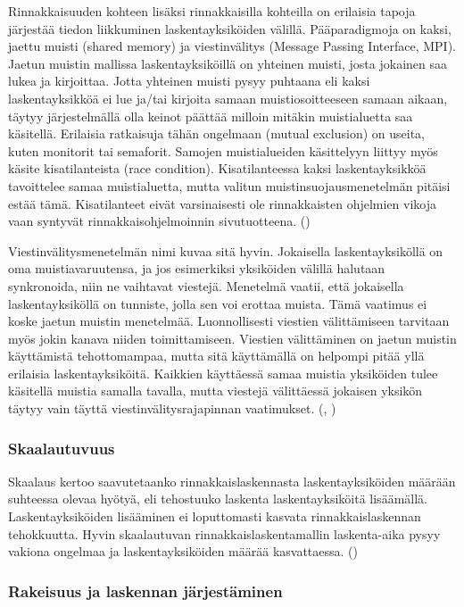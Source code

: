 Rinnakkaisuuden kohteen lisäksi rinnakkaisilla kohteilla on erilaisia tapoja
järjestää tiedon liikkuminen laskentayksiköiden välillä. Pääparadigmoja on
kaksi, jaettu muisti (shared memory) ja viestinvälitys (Message Passing Interface, MPI). Jaetun muistin mallissa
laskentayksiköillä on yhteinen muisti, josta jokainen saa lukea ja kirjoittaa.
Jotta yhteinen muisti pysyy puhtaana eli kaksi laskentayksikköä ei lue ja/tai
kirjoita samaan muistiosoitteeseen samaan aikaan, täytyy järjestelmällä
olla keinot päättää milloin mitäkin muistialuetta saa käsitellä.
Erilaisia ratkaisuja tähän ongelmaan (mutual exclusion) on useita, kuten
monitorit tai semaforit. Samojen muistialueiden käsittelyyn
liittyy myös käsite kisatilanteista (race condition). Kisatilanteessa kaksi
laskentayksikköä tavoittelee samaa muistialuetta, mutta valitun
muistinsuojausmenetelmän pitäisi estää tämä. Kisatilanteet eivät varsinaisesti
ole rinnakkaisten ohjelmien vikoja vaan syntyvät rinnakkaisohjelmoinnin
sivutuotteena. (\citealt{ari})

Viestinvälitysmenetelmän nimi kuvaa sitä hyvin. Jokaisella
laskentayksiköllä on oma muistiavaruutensa, ja jos esimerkiksi  yksiköiden
välillä halutaan synkronoida, niin ne vaihtavat viestejä. Menetelmä vaatii,
että jokaisella laskentayksiköllä on tunniste, jolla sen voi erottaa muista.
Tämä vaatimus ei koske jaetun muistin menetelmää. Luonnollisesti viestien
välittämiseen tarvitaan myös jokin kanava niiden toimittamiseen. Viestien
välittäminen on jaetun muistin käyttämistä tehottomampaa, mutta sitä
käyttämällä on helpompi pitää yllä erilaisia laskentayksiköitä. Kaikkien
käyttäessä samaa muistia yksiköiden tulee käsitellä muistia samalla tavalla,
mutta viestejä välittäessä jokaisen yksikön täytyy vain täyttä
viestinvälitysrajapinnan vaatimukset. (\citealt{intro}, \citealt{rauber})

\subsubsection{Skaalautuvuus}

Skaalaus kertoo saavutetaanko rinnakkaislaskennasta laskentayksiköiden määrään
suhteessa olevaa hyötyä, eli tehostuuko laskenta laskentayksiköitä lisäämällä.
Laskentayksiköiden lisääminen ei loputtomasti kasvata rinnakkaislaskennan
tehokkuutta. Hyvin skaalautuvan rinnakkaislaskentamallin laskenta-aika pysyy
vakiona ongelmaa ja laskentayksiköiden määrää kasvattaessa. (\citealt{rauber})

\subsubsection{Rakeisuus ja laskennan järjestäminen}

